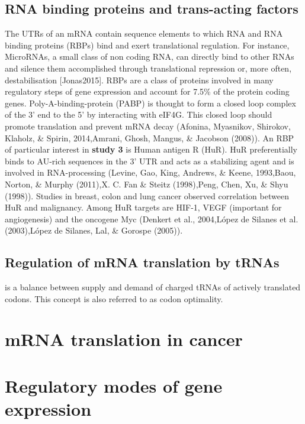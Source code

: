 \documentclass[12pt,openany]{book}
\begin{document}
\subsection{RNA binding proteins and trans-acting factors}

The UTRs of an mRNA contain sequence elements to which RNA and RNA
binding proteins (RBPs) bind and exert translational regulation. For
instance, MicroRNAs, a small class of non coding RNA, can directly bind
to other RNAs and silence them accomplished through translational
repression or, more often, destabilisation {[}Jonas2015{]}. RBPs are a
class of proteins involved in many regulatory steps of gene expression
and account for 7.5\% of the protein coding genes.
Poly-A-binding-protein (PABP) is thought to form a closed loop complex
of the 3' end to the 5' by interacting with eIF4G. This closed loop
should promote translation and prevent mRNA decay (Afonina, Myasnikov,
Shirokov, Klaholz, \& Spirin, 2014,Amrani, Ghosh, Mangus, \& Jacobson
(2008)). An RBP of particular interest in \textbf{study 3} is Human
antigen R (HuR). HuR preferentially binds to AU-rich sequences in the 3'
UTR and acts as a stabilizing agent and is involved in RNA-processing
(Levine, Gao, King, Andrews, \& Keene, 1993,Baou, Norton, \& Murphy
(2011),X. C. Fan \& Steitz (1998),Peng, Chen, Xu, \& Shyu (1998)).
Studies in breast, colon and lung cancer observed correlation between
HuR and malignancy. Among HuR targets are HIF-1, VEGF (important for
angiogenesis) and the oncogene Myc (Denkert et al., 2004,López de
Silanes et al. (2003),López de Silanes, Lal, \& Gorospe (2005)).

\subsection{Regulation of mRNA translation by tRNAs} \label{tRNA}

is a balance between supply and demand of charged tRNAs of actively
translated codons. This concept is also referred to as codon optimality.

\section{mRNA translation in cancer} \label{translationInCancer}

\section{Regulatory modes of gene expression}
\end{document}

